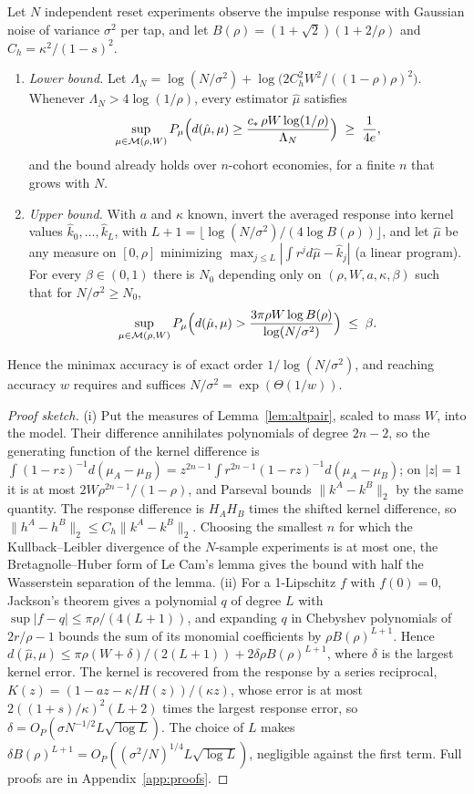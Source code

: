 \begin{theorem}\label{thm:general}
Let $N$ independent reset experiments observe the impulse response with Gaussian noise of variance $\sigma^2$ per tap, and let $B(\rho)=(1+\sqrt2)(1+2/\rho)$ and $C_h=\kappa^2/(1-s)^2$.
\begin{enumerate}[label=(\roman*)]
\item \emph{Lower bound.} Let $\Lambda_N=\log(N/\sigma^2)+\log\bigl(2C_h^2W^2/((1-\rho)\rho)^2\bigr)$. Whenever $\Lambda_N>4\log(1/\rho)$, every estimator $\hat\mu$ satisfies
\[
\sup_{\mu\in\mathcal M(\rho,W)}P_\mu\Bigl(d(\hat\mu,\mu)\ge\frac{c_*\,\rho W\log(1/\rho)}{\Lambda_N}\Bigr)\;\ge\;\frac1{4e},
\]
and the bound already holds over $n$-cohort economies, for a finite $n$ that grows with $N$.
\item \emph{Upper bound.} With $a$ and $\kappa$ known, invert the averaged response into kernel values $\hat k_0,\ldots,\hat k_L$, with $L+1=\lfloor\log(N/\sigma^2)/(4\log B(\rho))\rfloor$, and let $\hat\mu$ be any measure on $[0,\rho]$ minimizing $\max_{j\le L}|\int r^jd\hat\mu-\hat k_j|$ (a linear program). For every $\beta\in(0,1)$ there is $N_0$ depending only on $(\rho,W,a,\kappa,\beta)$ such that for $N/\sigma^2\ge N_0$,
\[
\sup_{\mu\in\mathcal M(\rho,W)}P_\mu\Bigl(d(\hat\mu,\mu)>\frac{3\pi\rho W\log B(\rho)}{\log(N/\sigma^2)}\Bigr)\;\le\;\beta .
\]
\end{enumerate}
Hence the minimax accuracy is of exact order $1/\log(N/\sigma^2)$, and reaching accuracy $w$ requires and suffices $N/\sigma^2=\exp(\Theta(1/w))$.
\end{theorem}

\begin{proof}[Proof sketch]
(i) Put the measures of Lemma~\ref{lem:altpair}, scaled to mass $W$, into the model. Their difference annihilates polynomials of degree $2n-2$, so the generating function of the kernel difference is $\int(1-rz)^{-1}d(\mu_A-\mu_B)=z^{2n-1}\int r^{2n-1}(1-rz)^{-1}d(\mu_A-\mu_B)$; on $|z|=1$ it is at most $2W\rho^{2n-1}/(1-\rho)$, and Parseval bounds $\|k^A-k^B\|_2$ by the same quantity. The response difference is $H_AH_B$ times the shifted kernel difference, so $\|h^A-h^B\|_2\le C_h\|k^A-k^B\|_2$. Choosing the smallest $n$ for which the Kullback--Leibler divergence of the $N$-sample experiments is at most one, the Bretagnolle--Huber form of Le Cam's lemma gives the bound with half the Wasserstein separation of the lemma. (ii) For a 1-Lipschitz $f$ with $f(0)=0$, Jackson's theorem gives a polynomial $q$ of degree $L$ with $\sup|f-q|\le\pi\rho/(4(L+1))$, and expanding $q$ in Chebyshev polynomials of $2r/\rho-1$ bounds the sum of its monomial coefficients by $\rho B(\rho)^{L+1}$. Hence $d(\hat\mu,\mu)\le\pi\rho(W+\delta)/(2(L+1))+2\delta\rho B(\rho)^{L+1}$, where $\delta$ is the largest kernel error. The kernel is recovered from the response by a series reciprocal, $K(z)=(1-az-\kappa/H(z))/(\kappa z)$, whose error is at most $2((1+s)/\kappa)^2(L+2)$ times the largest response error, so $\delta=O_P(\sigma N^{-1/2}L\sqrt{\log L})$. The choice of $L$ makes $\delta B(\rho)^{L+1}=O_P((\sigma^2/N)^{1/4}L\sqrt{\log L})$, negligible against the first term. Full proofs are in Appendix~\ref{app:proofs}.
\end{proof}

